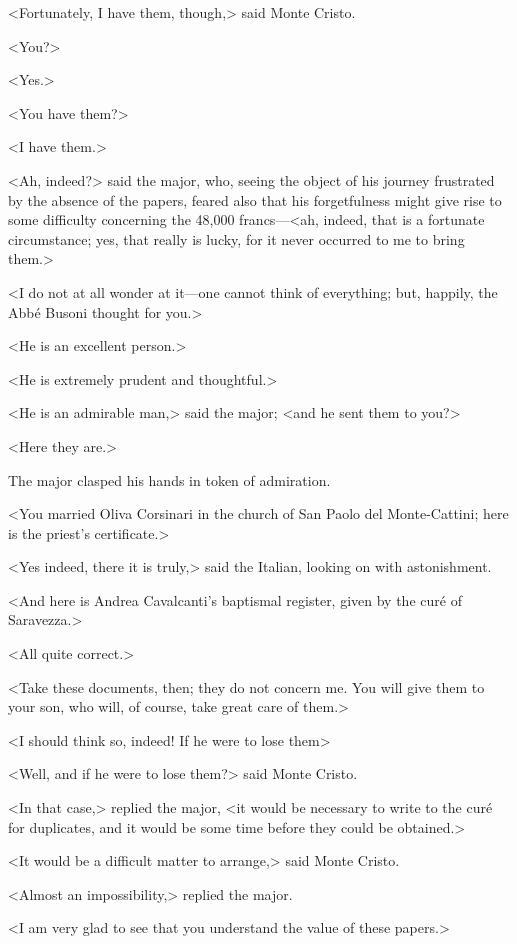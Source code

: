  <Fortunately, I have them, though,> said Monte Cristo. 

 <You?> 

 <Yes.> 

 <You have them?> 

 <I have them.> 

 <Ah, indeed?> said the major, who, seeing the object of his journey frustrated by the absence of the papers, feared also that his forgetfulness might give rise to some difficulty concerning the 48,000 francs—<ah, indeed, that is a fortunate circumstance; yes, that really is lucky, for it never occurred to me to bring them.> 

 <I do not at all wonder at it—one cannot think of everything; but, happily, the Abbé Busoni thought for you.> 

 <He is an excellent person.> 

 <He is extremely prudent and thoughtful.> 

 <He is an admirable man,> said the major; <and he sent them to you?> 

 <Here they are.> 

 The major clasped his hands in token of admiration. 

 <You married Oliva Corsinari in the church of San Paolo del Monte-Cattini; here is the priest's certificate.> 

 <Yes indeed, there it is truly,> said the Italian, looking on with astonishment. 

 <And here is Andrea Cavalcanti's baptismal register, given by the curé of Saravezza.> 

 <All quite correct.> 

 <Take these documents, then; they do not concern me. You will give them to your son, who will, of course, take great care of them.> 

 <I should think so, indeed! If he were to lose them\longdash> 

 <Well, and if he were to lose them?> said Monte Cristo. 

 <In that case,> replied the major, <it would be necessary to write to the curé for duplicates, and it would be some time before they could be obtained.> 

 <It would be a difficult matter to arrange,> said Monte Cristo. 

 <Almost an impossibility,> replied the major. 

 <I am very glad to see that you understand the value of these papers.> 

